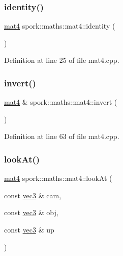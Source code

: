 \subsubsection{\texorpdfstring{identity()}{identity()}}
{\footnotesize\ttfamily \hyperlink{structspork_1_1maths_1_1mat4}{mat4} spork\+::maths\+::mat4\+::identity (\begin{DoxyParamCaption}{ }\end{DoxyParamCaption})\hspace{0.3cm}{\ttfamily [static]}}



Definition at line 25 of file mat4.\+cpp.

\mbox{\label{structspork_1_1maths_1_1mat4_a6b3f2da18fbf011ad5856ff83278ebe5}} 
\subsubsection{\texorpdfstring{invert()}{invert()}}
{\footnotesize\ttfamily \hyperlink{structspork_1_1maths_1_1mat4}{mat4} \& spork\+::maths\+::mat4\+::invert (\begin{DoxyParamCaption}{ }\end{DoxyParamCaption})}



Definition at line 63 of file mat4.\+cpp.

\mbox{\label{structspork_1_1maths_1_1mat4_ab9fb102f6e628b289edfe09e4b9ffe04}} 
\subsubsection{\texorpdfstring{look\+At()}{lookAt()}}
{\footnotesize\ttfamily \hyperlink{structspork_1_1maths_1_1mat4}{mat4} spork\+::maths\+::mat4\+::look\+At (\begin{DoxyParamCaption}\item[{const \hyperlink{structspork_1_1maths_1_1vec3}{vec3} \&}]{cam,  }\item[{const \hyperlink{structspork_1_1maths_1_1vec3}{vec3} \&}]{obj,  }\item[{const \hyperlink{structspork_1_1maths_1_1vec3}{vec3} \&}]{up }\end{DoxyParamCaption})\hspace{0.3cm}{\ttfamily [static]}}



